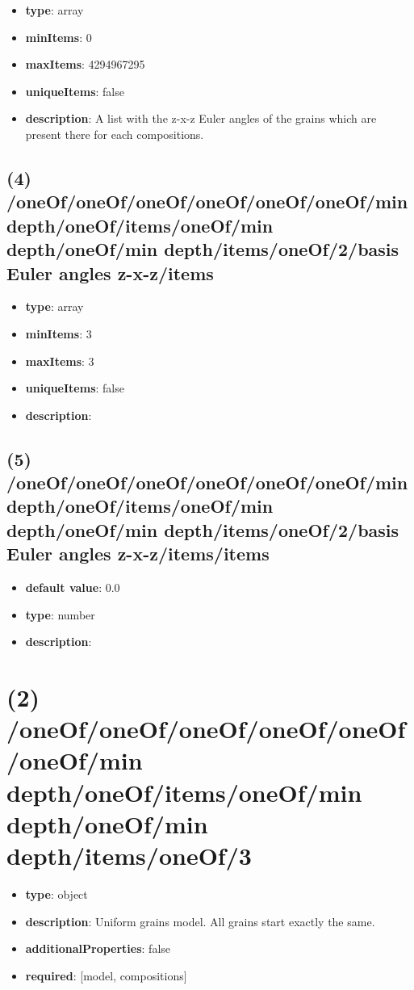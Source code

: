 \begin{itemize}[leftmargin=3em]\item {\bf type}: array
\item {\bf minItems}: 0
\item {\bf maxItems}: 4294967295
\item {\bf uniqueItems}: false
\item {\bf description}: A list with the z-x-z Euler angles of the grains which are present there for each compositions.
\end{itemize}\subsection{(4) /oneOf/oneOf/oneOf/oneOf/oneOf/oneOf/min depth/oneOf/items/oneOf/min depth/oneOf/min depth/items/oneOf/2/basis Euler angles z-x-z/items}
\begin{itemize}[leftmargin=4em]\item {\bf type}: array
\item {\bf minItems}: 3
\item {\bf maxItems}: 3
\item {\bf uniqueItems}: false
\item {\bf description}: 
\end{itemize}\subsection{(5) /oneOf/oneOf/oneOf/oneOf/oneOf/oneOf/min depth/oneOf/items/oneOf/min depth/oneOf/min depth/items/oneOf/2/basis Euler angles z-x-z/items/items}
\begin{itemize}[leftmargin=5em]\item {\bf default value}: 0.0
\item {\bf type}: number
\item {\bf description}: 
\end{itemize}\section{(2) /oneOf/oneOf/oneOf/oneOf/oneOf/oneOf/min depth/oneOf/items/oneOf/min depth/oneOf/min depth/items/oneOf/3}
\begin{itemize}[leftmargin=2em]\item {\bf type}: object
\item {\bf description}: Uniform grains model. All grains start exactly the same.
\item {\bf additionalProperties}: false
\item {\bf required}: [model, compositions]\end{itemize}
